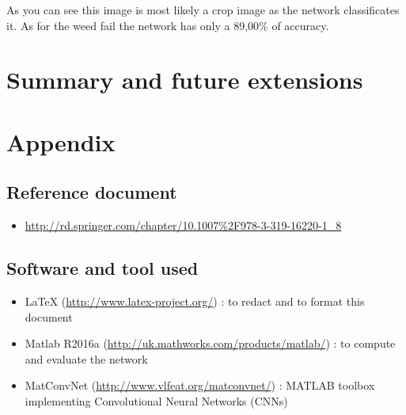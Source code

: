 \documentclass[]{report}
\begin{document}
As you can see this image is most likely a crop image as the network classificates it. As for the weed fail the network has only a 89,00\% of accuracy. 

\chapter{Summary and future extensions}

\chapter{Appendix}

\section{Reference document}
 \begin{itemize}
 
 	\item\url{http://rd.springer.com/chapter/10.1007%2F978-3-319-16220-1_8}
	
 \end{itemize}

\section{Software and tool used}

\begin{itemize}
	
	\item LaTeX (\url{http://www.latex-project.org/}) : to redact and to format this document
	
	\item Matlab R2016a (\url{http://uk.mathworks.com/products/matlab/}) : to compute and 					  evaluate the network
	
	\item MatConvNet (\url{http://www.vlfeat.org/matconvnet/}) : MATLAB toolbox implementing 				  Convolutional Neural Networks (CNNs) 
	 
\end{itemize}
\end{document}
